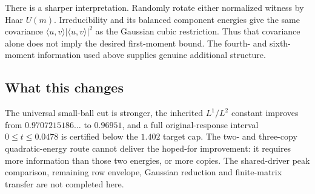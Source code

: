 There is a sharper interpretation. Randomly rotate either normalized witness by Haar $U(m)$. Irreducibility and its balanced component energies give the same covariance $\langle u,v\rangle|\langle u,v\rangle|^2$ as the Gaussian cubic restriction. Thus that covariance alone does not imply the desired first-moment bound. The fourth- and sixth-moment information used above supplies genuine additional structure.

\subsection{What this changes}
The universal small-ball cut is stronger, the inherited $L^1/L^2$ constant improves from $0.9707215186\ldots$ to $0.96951$, and a full original-response interval $0\le t\le0.0478$ is certified below the $1.402$ target cap. The two- and three-copy quadratic-energy route cannot deliver the hoped-for improvement: it requires more information than those two energies, or more copies. The shared-driver peak comparison, remaining row envelope, Gaussian reduction and finite-matrix transfer are not completed here.


